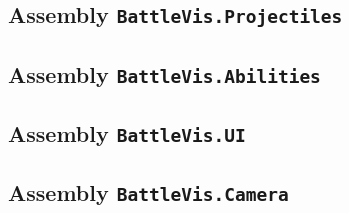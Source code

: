 \subsection{Assembly \texttt{BattleVis.Projectiles}}

\subsection{Assembly \texttt{BattleVis.Abilities}}

\subsection{Assembly \texttt{BattleVis.UI}}

\subsection{Assembly \texttt{BattleVis.Camera}}